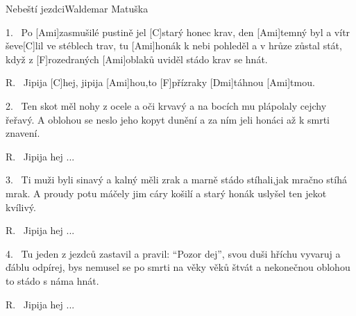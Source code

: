 \begin{song}{Nebeští jezdci}{Waldemar Matuška}

\begin{xverse}{1.~}
Po [Ami]zasmušilé pustině jel [C]starý honec krav,
den [Ami]temný byl a vítr ševe[C]lil ve stéblech trav,
tu [Ami]honák k nebi pohleděl a v hrůze zůstal stát,
když z [F]rozedraných [Ami]oblaků uviděl stádo krav se hnát.
\end{xverse}

\begin{xverse}{R.~}
Jipija [C]hej, jipija [Ami]hou,to [F]přízraky [Dmi]táhnou [Ami]tmou.
\end{xverse}

\begin{xverse}{2.~}
Ten skot měl nohy z ocele a oči krvavý
a na bocích mu plápolaly cejchy řeřavý.
A oblohou se neslo jeho kopyt dunění
a za ním jeli honáci až k smrti znavení.
\end{xverse}

\begin{xverse}{R.~}
Jipija hej ...
\end{xverse}


\begin{xverse}{3.~}
Ti muži byli sinavý a kalný měli zrak
a marně stádo stíhali,jak mračno stíhá mrak.
A proudy potu máčely jim cáry košilí
a starý honák uslyšel ten jekot kvílivý.
\end{xverse}

\begin{xverse}{R.~}
Jipija hej ...
\end{xverse}

\begin{xverse}{4.~}
Tu jeden z jezdců zastavil a pravil: ``Pozor dej'',
svou duši hříchu vyvaruj a ďáblu odpírej,
bys nemusel se po smrti na věky věků štvát
a nekonečnou oblohou to stádo s náma hnát.
\end{xverse}

\begin{xverse}{R.~}
Jipija hej ...
\end{xverse}

\end{song}

